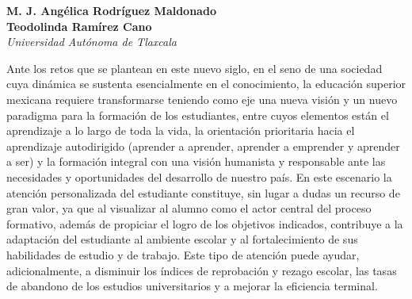 \thispagestyle{empty}
{\par}
\setcounter{footnote}{0}

\bigskip
\begin{center}
{\bfseries M. J. Angélica Rodríguez Maldonado\\
Teodolinda Ramírez Cano}\\
{\itshape Universidad Autónoma de Tlaxcala} 
\end{center}

\bigskip
Ante los retos que se plantean en este nuevo siglo, en el seno de una sociedad cuya  dinámica se sustenta  esencialmente  en  el  conocimiento,  la  educación superior mexicana requiere transformarse teniendo como eje una nueva visión y un nuevo paradigma para la formación de los estudiantes, entre cuyos elementos están el aprendizaje a lo largo de toda la vida, la orientación prioritaria hacia el aprendizaje autodirigido (aprender a aprender, aprender a emprender y aprender a ser) y  la formación  integral con una visión  humanista y  responsable ante  las necesidades y oportunidades del desarrollo de nuestro país. En este escenario la atención personalizada del estudiante constituye, sin lugar a dudas un recurso de gran valor, ya  que al visualizar  al alumno como el actor  central del  proceso formativo, además de propiciar el logro de los objetivos indicados, contribuye a la adaptación del estudiante al ambiente escolar y al fortalecimiento de sus habilidades de estudio y de trabajo. Este tipo de atención puede ayudar, adicionalmente, a disminuir los índices de reprobación y rezago escolar, las tasas de abandono de los estudios universitarios y a mejorar la eficiencia terminal.

